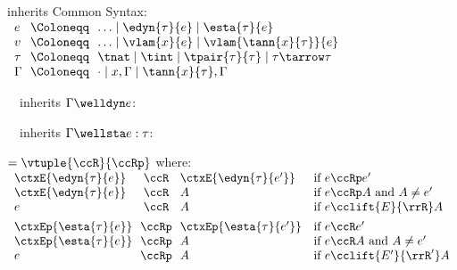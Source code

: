 \begin{flushleft}

 inherits Common Syntax:\\
$\begin{array}{l@{~~}c@{~~}l}
  e & \Coloneqq & \ldots \mid \edyn{\tau}{e} \mid \esta{\tau}{e}
\\
  v & \Coloneqq & \ldots \mid \vlam{x}{e} \mid \vlam{\tann{x}{\tau}}{e}
\\
  \tau & \Coloneqq & \tnat \mid \tint \mid \tpair{\tau}{\tau} \mid \tau \tarrow \tau
\\
  \Gamma & \Coloneqq & \cdot \mid x,\Gamma \mid \tann{x}{\tau},\Gamma
\end{array}$

\medskip
\begin{minipage}[t]{0.5\columnwidth}
~~inherits $\Gamma \welldyn e$:\\
\begin{mathpar}
\end{mathpar}
\end{minipage}%
\begin{minipage}[t]{0.5\columnwidth}
~~inherits $\Gamma \wellsta e : \tau$:\\
\begin{mathpar}

\end{mathpar}
\end{minipage}

\medskip
{} $= \vtuple{\ccR}{\ccRp}$ where:\\
$\begin{array}{l@{~~}c@{~~}l l}
\ctxE{\edyn{\tau}{e}} & \ccR & \ctxE{\edyn{\tau}{e'}}
  & \mbox{if $e \ccRp e'$}
\\
\ctxE{\edyn{\tau}{e}} & \ccR & A
  & \mbox{if $e \ccRp A$ and $A \neq e'$}
\\
e & \ccR & A
  & \mbox{if $e \cclift{E}{\rrR} A$}
\\[1ex]
\ctxEp{\esta{\tau}{e}} & \ccRp & \ctxEp{\esta{\tau}{e'}}
 & \mbox{if $e \ccR e'$}
\\
\ctxEp{\esta{\tau}{e}} & \ccRp & A
 & \mbox{if $e \ccR A$ and $A \neq e'$}
\\
e & \ccRp & A
 & \mbox{if $e \cclift{E'}{\rrR'} A$}
\end{array}$

\end{flushleft}
